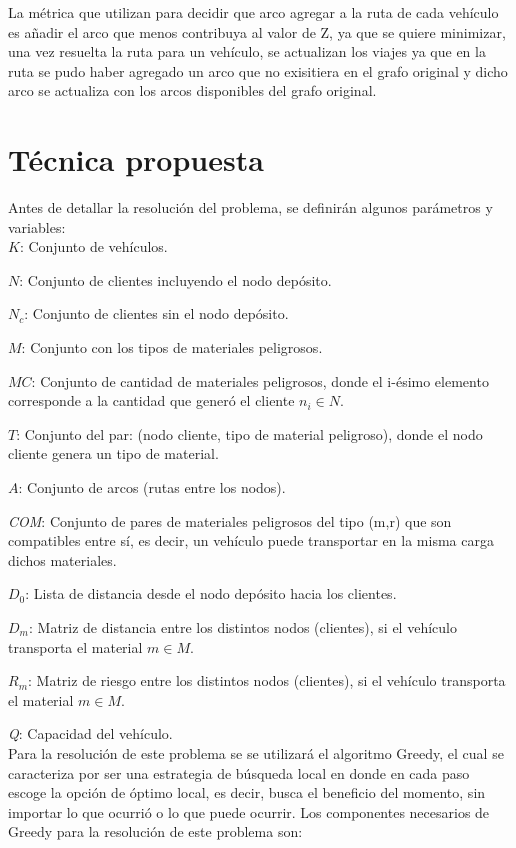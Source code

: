 \documentclass[conference]{IEEEtran}
\begin{document}
La m\'etrica que utilizan para decidir que arco agregar a la ruta de cada veh\'iculo es a\~nadir el arco que menos contribuya al valor de Z, ya que se quiere minimizar, una vez resuelta la ruta para un veh\'iculo, se actualizan los viajes ya que en la ruta se pudo haber agregado un arco que no exisitiera en el grafo original y dicho arco se actualiza con los arcos disponibles del grafo original.
\\

\section{T\'ecnica propuesta}

Antes de detallar la resoluci\'on del problema, se definir\'an algunos par\'ametros y variables:
\\

\textit{$K$}: Conjunto de veh\'iculos.

\textit{$N$}: Conjunto de clientes incluyendo el nodo dep\'osito.

\textit{$N_c$}: Conjunto de clientes sin el nodo dep\'osito.

\textit{$M$}: Conjunto con los tipos de materiales peligrosos.

\textit{$MC$}: Conjunto de cantidad de materiales peligrosos, donde el i-\'esimo elemento corresponde a la cantidad que gener\'o el cliente $n_i \in N$.

\textit{$T$}: Conjunto del par: (nodo cliente, tipo de material peligroso), donde el nodo cliente genera un tipo de material.

\textit{$A$}: Conjunto de arcos (rutas entre los nodos).

\textit{COM}: Conjunto de pares de materiales peligrosos del tipo (m,r) que son compatibles entre s\'i, es decir, un veh\'iculo puede transportar en la misma carga dichos materiales.

\textit{$D_0$}: Lista de distancia desde el nodo dep\'osito hacia los clientes.

\textit{$D_m$}: Matriz de distancia entre los distintos nodos (clientes), si el veh\'iculo transporta el material $m \in M$.

\textit{$R_m$}: Matriz de riesgo entre los distintos nodos (clientes), si el veh\'iculo transporta el material $m \in M$.

\textit{Q}: Capacidad del veh\'iculo.
\\



Para la resoluci\'on de este problema se se utilizar\'a el algoritmo Greedy, el cual se caracteriza por ser una estrategia de b\'usqueda local en donde en cada paso escoge la opci\'on de \'optimo local, es decir, busca el beneficio del momento, sin importar lo que ocurri\'o o lo que puede ocurrir. Los componentes necesarios de Greedy para la resoluci\'on de este problema son:
\end{document}
